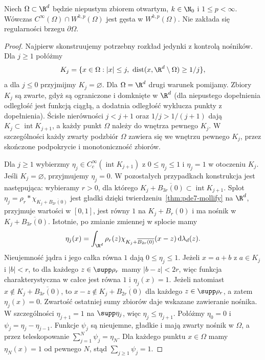 \begin{twierdzenie}
\label{thm:pde9-MeyersSerrin}
Niech $\Omega\subset\R^d$ będzie niepustym zbiorem otwartym,
$k\in\N_0$ i $1\le p<\infty$. Wówczas
$C^\infty(\Omega)\cap W^{k,p}(\Omega)$
jest gęsta w $W^{k,p}(\Omega)$.
Nie zakłada się regularności brzegu $\partial\Omega$.
\end{twierdzenie}
\begin{proof}
Najpierw skonstruujemy potrzebny rozkład jedynki
z kontrolą nośników. Dla $j\ge1$ połóżmy
\[
 K_j=\{x\in\Omega:|x|\le j,\
 \operatorname{dist}(x,\R^d\setminus\Omega)\ge1/j\},
\]
a dla $j\le0$ przyjmijmy $K_j=\varnothing$.
Dla $\Omega=\R^d$ drugi warunek pomijamy.
Zbiory $K_j$ są zwarte, gdyż są ograniczone
i domknięte w $\R^d$ (dla niepustego dopełnienia
odległość jest funkcją ciągłą, a dodatnia odległość
wyklucza punkty z dopełnienia).
Ścisłe nierówności $j<j+1$ oraz $1/j>1/(j+1)$
dają $K_j\subset\operatorname{int}K_{j+1}$,
a każdy punkt $\Omega$ należy do wnętrza pewnego $K_j$.
W szczególności każdy zwarty podzbiór $\Omega$
zawiera się we wnętrzu pewnego $K_j$, przez skończone
podpokrycie i monotoniczność zbiorów.

Dla $j\ge1$ wybierzmy $\eta_j\in C_c^\infty(\operatorname{int}K_{j+1})$
z $0\le\eta_j\le1$ i $\eta_j=1$ w otoczeniu $K_j$.
Jeśli $K_j=\varnothing$, przyjmujemy $\eta_j=0$.
W pozostałych przypadkach konstrukcja jest następująca:
wybieramy $r>0$, dla którego
$K_j+\overline{B_{3r}(0)}\subset\operatorname{int}K_{j+1}$.
Splot
$\eta_j=\rho_r*\chi_{K_j+\overline{B_{2r}(0)}}$
jest gładki dzięki twierdzeniu~\ref{thm:pde7-mollify}
na $\R^d$, przyjmuje wartości w $[0,1]$,
jest równy $1$ na $K_j+B_r(0)$ i ma nośnik
w $K_j+\overline{B_{3r}(0)}$.
Istotnie, po zmianie zmiennej w splocie mamy
\[
 \eta_j(x)=\int_{\R^d}\rho_r(z)
 \chi_{K_j+\overline{B_{2r}(0)}}(x-z)\,
 \mathrm d\lambda_d(z).
\]
Nieujemność jądra i jego całka równa $1$ dają
$0\le\eta_j\le1$. Jeżeli $x=a+b$ z $a\in K_j$
i $|b|<r$, to dla każdego $z\in\supp\rho_r$
mamy $|b-z|<2r$, więc funkcja charakterystyczna
w całce jest równa $1$ i $\eta_j(x)=1$.
Jeżeli natomiast $x\notin K_j+\overline{B_{3r}(0)}$,
to $x-z\notin K_j+\overline{B_{2r}(0)}$ dla każdego
$z\in\supp\rho_r$, a zatem $\eta_j(x)=0$.
Zwartość ostatniej sumy zbiorów daje wskazane
zawieranie nośnika.
W szczególności $\eta_{j+1}=1$ na $\supp\eta_j$,
więc $\eta_j\le\eta_{j+1}$.
Połóżmy $\eta_0=0$ i $\psi_j=\eta_j-\eta_{j-1}$.
Funkcje $\psi_j$ są nieujemne, gładkie i mają zwarty nośnik
w $\Omega$, a przez teleskopowanie
$\sum_{j=1}^N\psi_j=\eta_N$.
Dla każdego punktu $x\in\Omega$ mamy $\eta_N(x)=1$
od pewnego $N$, stąd $\sum_{j\ge1}\psi_j=1$.


\end{proof}
